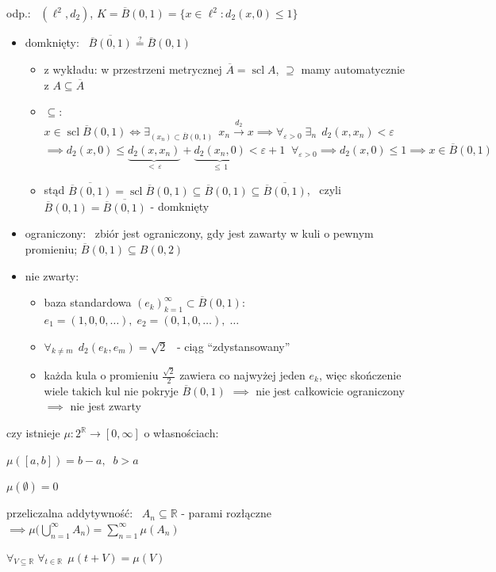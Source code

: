 \documentclass[a4paper,12pt]{article}
\begin{document}
\smallskip
odp.: \, \((\ell^2, d_2)\), \; \(K = \overline{B}(0, 1) = \{x \in \ell^2 : d_2(x, 0) \leq 1\}\)
\begin{itemize}
    \item domknięty: \, \(\overline{\overline{B}(0, 1)} \overset{?}{=} \overline{B}(0, 1)\)
    \begin{itemize}
        \item z wykładu: w przestrzeni metrycznej \(\overline{A} = \operatorname{scl} A\), \; \(\supseteq\) mamy automatycznie z \(A \subseteq \overline{A}\)
        \item \(\subseteq\): \, \(x \in \operatorname{scl} \overline{B}(0, 1) \iff \exists_{(x_n) \subset \overline{B}(0, 1)} \;\, x_n \xrightarrow{d_2} x \implies \forall_{\varepsilon > 0} \; \exists_n \;\, d_2(x, x_n) < \varepsilon\) \\
        \(\implies d_2(x, 0) \leq \underbrace{d_2(x, x_n)}_{< \, \varepsilon} + \underbrace{d_2(x_n, 0)}_{\leq \, 1} < \varepsilon + 1 \;\; \forall_{\varepsilon > 0} \implies d_2(x, 0) \leq 1 \implies x \in \overline{B}(0, 1)\)
        \item stąd \(\overline{\overline{B}(0, 1)} = \operatorname{scl} \overline{B}(0, 1) \subseteq \overline{B}(0, 1) \subseteq \overline{\overline{B}(0, 1)}\), \, czyli \(\overline{B}(0, 1) = \overline{\overline{B}(0, 1)}\) - domknięty
    \end{itemize}
    \item ograniczony: \, zbiór jest ograniczony, gdy jest zawarty w kuli o pewnym promieniu; \; \(\overline{B}(0, 1) \subseteq B(0, 2)\)
    \item nie zwarty:
    \begin{itemize}
        \item baza standardowa \((e_k)_{k=1}^{\infty} \subset \overline{B}(0, 1)\): \, \(e_1 = (1, 0, 0, \dots), \; e_2 = (0, 1, 0, \dots), \; \dots\)
        \item \(\forall_{k \neq m} \;\, d_2(e_k, e_m) = \sqrt{2}\) \, - ciąg \enquote{zdystansowany}
        \item każda kula o promieniu \(\frac{\sqrt{2}}{2}\) zawiera co najwyżej jeden \(e_k\), więc skończenie wiele takich kul nie pokryje \(\overline{B}(0, 1)\) \(\implies\) nie jest całkowicie ograniczony \(\implies\) nie jest zwarty
    \end{itemize}
\end{itemize}

\newpage
{}

\bigskip
czy istnieje \(\mu: 2^{\mathbb{R}} \to [0, \infty]\) o własnościach:
\begin{podpunkty}
    \item \(\mu([a, b]) = b - a, \;\; b > a\)
    \item \(\mu(\emptyset) = 0\)
    \item przeliczalna addytywność: \, \(A_n \subseteq \mathbb{R}\) - parami rozłączne \(\implies \mu\big(\bigcup_{n=1}^{\infty} A_n\big) = \displaystyle\sum_{n=1}^{\infty} \mu(A_n)\)
    \item \(\forall_{V \subseteq \mathbb{R}} \; \forall_{t \in \mathbb{R}} \;\, \mu(t + V) = \mu(V)\)
\end{podpunkty}
\end{document}
